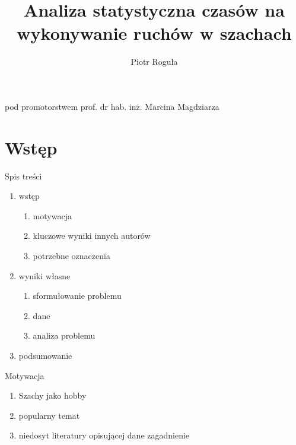 \documentclass{beamer}
\author{Piotr Rogula}
\title{Analiza statystyczna czasów na wykonywanie ruchów w
	szachach}
\institute[Pwr]{Politechnika Wrocławska}
\begin{document}
\begin{frame}[plain]
    \maketitle
    \begin{center}
    	pod promotorstwem prof. dr hab. inż. Marcina Magdziarza
    \end{center}
\end{frame}

\section{Wstęp}

\begin{frame}{Spis treści}

\begin{enumerate}
\item wstęp
	\begin{enumerate}
		\item motywacja
		\item kluczowe wyniki innych autorów
		\item potrzebne oznaczenia
	\end{enumerate}
\item wyniki własne
	\begin{enumerate}
		\item sformułowanie problemu
		\item dane
		\item analiza problemu
	\end{enumerate}
\item podsumowanie
\end{enumerate}

\end{frame}

		\begin{frame}{Motywacja}
			\begin{enumerate}
				\item Szachy jako hobby
				\item popularny temat
				\item niedosyt literatury opisującej dane zagadnienie
			\end{enumerate}	
		\end{frame}
\end{document}
